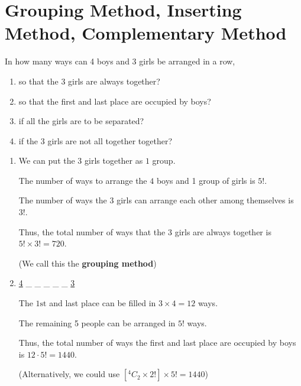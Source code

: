 \documentclass[11pt,a4paper]{book}
\begin{document}
\newpage


\section{Grouping Method, Inserting Method, Complementary Method}

\begin{example}

In how many ways can 4 boys and 3 girls be arranged in a row,

\begin{enumerate}[label=(\alph*)] 

\item  so that the 3 girls are always together?

\item  so that the first and last place are occupied by boys?

\item  if all the girls are to be separated?

\item  if the 3 girls are not all together together?

\end{enumerate}

\Solution

\begin{enumerate}[label=(\alph*)] 

\item  We can put the $3$ girls together as $1$ group. 

The number of ways to arrange the $4$ boys and 1 group of girls is
$5!$.

The number of ways the $3$ girls can arrange each other among themselves
is $3!$.

Thus, the total number of ways that the $3$ girls are always together
is $5!\times3!=720$.

(We call this the \textbf{grouping method})

\item  \uline{4} \_ \_ \_ \_ \_ \uline{3}

The $1\text{st}$ and last place can be filled in $3\times4=12$ ways.

The remaining 5 people can be arranged in $5!$ ways.

Thus, the total number of ways the first and last place are occupied
by boys is $12\cdot5!=1440$.

(Alternatively, we could use $\left[^{4}C_{2}\times2!\right]\times5!=1440$)


\end{enumerate}
\end{example}
\end{document}
